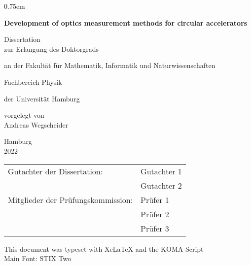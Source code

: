 \thispagestyle{empty}
\vspace{5cm}
\parskip0.75em
\begin{center}
    \Huge\bfseries
    Development of optics measurement methods for circular accelerators

    \vspace{3cm}
    \mdseries\Large
    Dissertation\\
    \vspace{1em}
    zur Erlangung des Doktorgrads

    an der Fakult\"at f\"ur Mathematik, Informatik und Naturwissenschaften
    
    Fachbereich Physik
    
    \vspace{1em}
    der Universit\"at Hamburg

    \vspace{2cm}
    \vfill
    vorgelegt von\\
    Andreas Wegscheider
    \vspace{2em}

    Hamburg\\
    2022
\end{center}
\cleardoublepage
{}

\thispagestyle{empty}
\renewcommand\baselinestretch{1.75}\selectfont
\begin{tabular}{ll}
   Gutachter der Dissertation: & Gutachter 1\\
    & Gutachter 2\\
   Mitglieder der Prüfungskommission: & Prüfer 1\\
   & Prüfer 2\\
   & Prüfer 3
\end{tabular}
\vfill
\renewcommand\baselinestretch{\textlinespread}\selectfont
\noindent This document was typeset with XeLaTeX and the KOMA-Script\\
Main Font: STIX Two

\tableofcontents
\cleardoublepage
